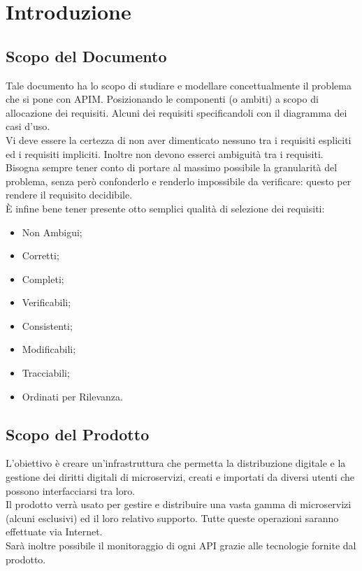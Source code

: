 \documentclass[12pt,a4paper,titlepage]{article}
\begin{document}
	\newpage
	
	\section{Introduzione}
	\subsection{Scopo del Documento}
	Tale documento ha lo scopo di studiare e modellare concettualmente il problema che si pone con APIM. Posizionando le componenti (o ambiti) a scopo di allocazione dei requisiti. Alcuni dei requisiti specificandoli con il diagramma dei casi d'uso.\\
	Vi deve essere la certezza di non aver dimenticato nessuno tra i requisiti espliciti ed i requisiti impliciti. Inoltre non devono esserci ambiguità tra i requisiti.
	Bisogna sempre tener conto di portare al massimo possibile la granularità del problema, senza però confonderlo e renderlo impossibile da verificare: questo per rendere il requisito decidibile.\\
	È infine bene tener presente otto semplici qualità di selezione dei requisiti:
	\begin{itemize}
		\item Non Ambigui;
		\item Corretti;
		\item Completi;
		\item Verificabili;
		\item Consistenti;
		\item Modificabili;
		\item Tracciabili;
		\item Ordinati per Rilevanza.
	\end{itemize}
	\subsection{Scopo del Prodotto}
	L'obiettivo è creare un'infrastruttura che permetta la distribuzione digitale e la gestione dei diritti digitali di microservizi, creati e importati da diversi utenti che possono interfacciarsi tra loro.\\
	Il prodotto verrà usato per gestire e distribuire una vasta gamma di microservizi (alcuni esclusivi) ed il loro relativo supporto. Tutte queste operazioni saranno effettuate via Internet.\\
	Sarà inoltre possibile il monitoraggio di ogni API grazie alle tecnologie fornite dal prodotto.\\
	
\end{document}
